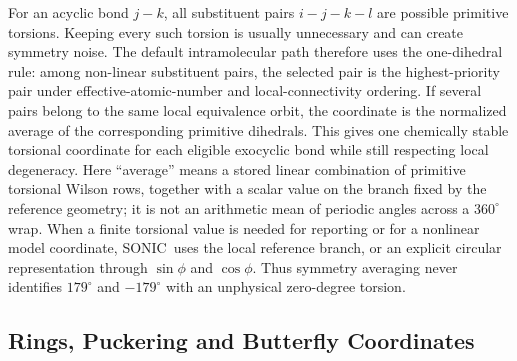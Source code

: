 \documentclass[journal=jctcce,manuscript=article,layout=traditional]{achemso}
\newcommand{\SONIC}{SONIC}
\theoremstyle{definition}
\begin{document}
For an acyclic bond \(j-k\), all substituent pairs \(i-j-k-l\) are possible
primitive torsions.  Keeping every such torsion is usually unnecessary and can
create symmetry noise.  The default intramolecular path therefore uses the
one-dihedral rule: among non-linear substituent pairs, the selected pair is the
highest-priority pair under effective-atomic-number and local-connectivity
ordering.  If several pairs belong to the same local equivalence orbit, the
coordinate is the normalized average of the corresponding primitive dihedrals.
This gives one chemically stable torsional coordinate for each eligible
exocyclic bond while still respecting local degeneracy.
Here ``average'' means a stored linear combination of primitive torsional
Wilson rows, together with a scalar value on the branch fixed by the reference
geometry; it is not an arithmetic mean of periodic angles across a
\(360^\circ\) wrap.  When a finite torsional value is needed for reporting or
for a nonlinear model coordinate, \SONIC\ uses the local reference branch, or an
explicit circular representation through \(\sin\phi\) and \(\cos\phi\).  Thus
symmetry averaging never identifies \(179^\circ\) and \(-179^\circ\) with an
unphysical zero-degree torsion.

\subsection{Rings, Puckering and Butterfly Coordinates}
\end{document}
